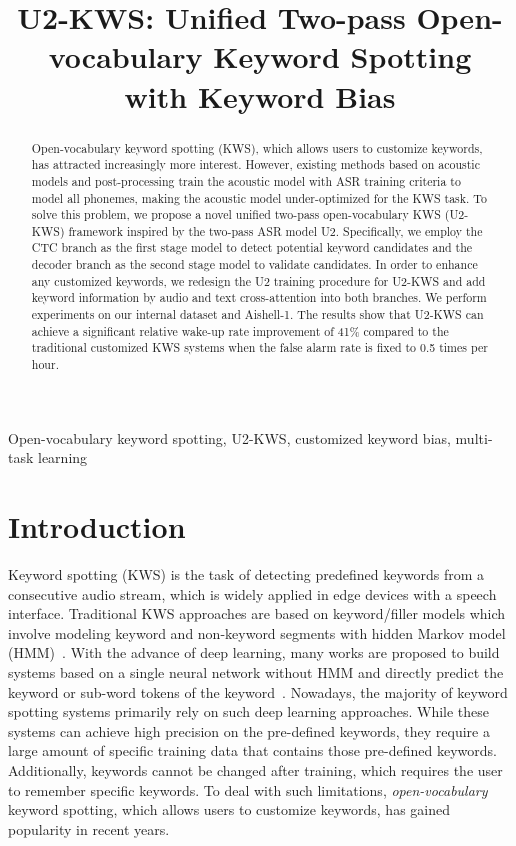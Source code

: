 \documentclass{article}
\title{U2-KWS: Unified Two-pass Open-vocabulary Keyword Spotting 
\\ with Keyword Bias}
\begin{document}
%
\maketitle
%
\begin{abstract}
Open-vocabulary keyword spotting (KWS), which allows users to customize keywords, has attracted increasingly more interest. However, existing methods based on acoustic models and post-processing train the acoustic model with ASR training criteria to model all phonemes, making the acoustic model under-optimized for the KWS task. To solve this problem, we propose a novel unified two-pass open-vocabulary KWS (U2-KWS) framework inspired by the two-pass ASR model U2. Specifically, we employ the CTC branch as the first stage model to detect potential keyword candidates and the decoder branch as the second stage model to validate candidates. In order to enhance any customized keywords, we redesign the U2 training procedure for U2-KWS and add keyword information by audio and text cross-attention into both branches. We perform experiments on our internal dataset and Aishell-1. The results show that U2-KWS can achieve a significant relative wake-up rate improvement of 41\% compared to the traditional customized KWS systems when the false alarm rate is fixed to 0.5 times per hour.



\end{abstract}
%
\begin{keywords}
Open-vocabulary keyword spotting, U2-KWS, customized keyword bias, multi-task learning
\end{keywords}
%
\section{Introduction}
\label{sec:intro}

Keyword spotting (KWS) is the task of detecting predefined keywords from a consecutive audio stream, which is widely applied in edge devices with a speech interface. Traditional KWS approaches are based on keyword/filler models which involve modeling keyword and non-keyword segments with hidden Markov model (HMM)~\cite{hmm1,hmm2}. With the advance of deep learning, many works are proposed to build systems based on a single neural network without HMM and directly predict the keyword or sub-word tokens of the keyword~\cite{0Convolutional,2014Small,wei2021end,jose2020accurate,berg2021keyword}. Nowadays, the majority of keyword spotting systems primarily rely on such deep learning approaches. While these systems can achieve high precision on the pre-defined keywords, they require a large amount of specific training data that contains those pre-defined keywords. Additionally, keywords cannot be changed after training, which requires the user to remember specific keywords. To deal with such limitations, \textit{open-vocabulary} keyword spotting, which allows users to customize keywords, has gained popularity in recent years.
\end{document}
